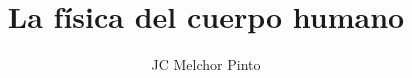 \documentclass[12pt,addpoints,answers]{guia}
\title{La física del cuerpo humano}
\author{JC Melchor Pinto}
\begin{document}
\INFO%

\vspace{0.5em}
\begin{questions}
    \questionboxed[15]{}%
    \questionboxed[15]{}
    \questionboxed[15]{}
    \questionboxed[15]{}
    
    \questionboxed[25]{}
    \questionboxed[15]{}
\end{questions}
\end{document}
